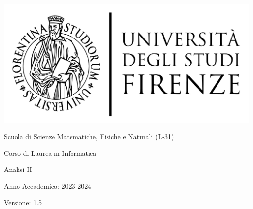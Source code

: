 \documentclass[11pt]{article}
\newcommand{\myDegree}{Corso di Laurea in Informatica}
\newcommand{\myFaculty}{
	Scuola di Scienze Matematiche, Fisiche e Naturali (L{-}31)}
\newcommand{\myTime}{Anno Accademico{:} 2023{-}2024}
\newcommand{\myVersion}{1.5}
\begin{document}
\begin{titlepage}
   \begin{center}
      \hfill
      \vspace{2cm}

      \begingroup
      \large
      \includegraphics[scale=0.15]{images/unifi-logo}

      \myFaculty{}

      \myDegree{}
      \endgroup

      \vspace{5cm}

      \begingroup
      \LARGE
      \color{red} Analisi II
      \endgroup
      \medskip

      \myTime{}

      \vfill

      \begingroup
      \hfill Versione: \myVersion{}
      \endgroup

   \end{center}
\end{titlepage}
\newpage

\tableofcontents
\newpage


\newpage


\newpage


\newpage


\newpage
\end{document}
